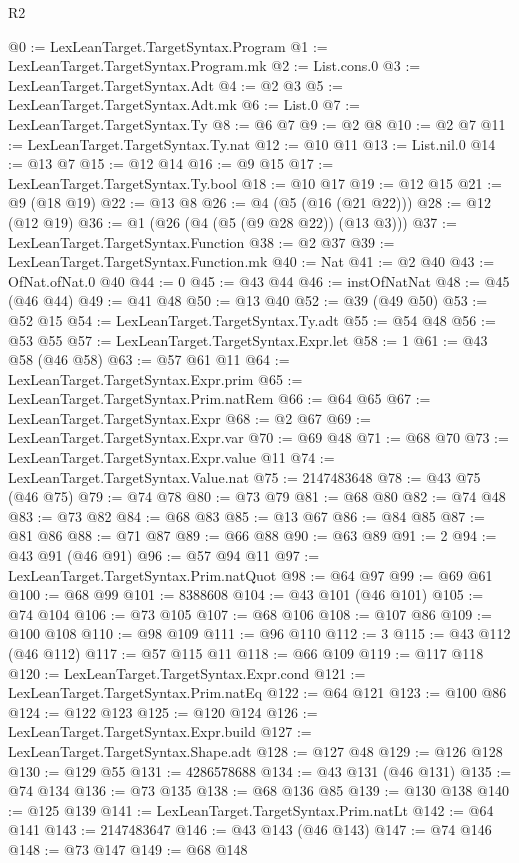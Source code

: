 \begin{lexlean}{R2}
\begin{coremodule}
@0 := LexLeanTarget.TargetSyntax.Program
@1 := LexLeanTarget.TargetSyntax.Program.mk
@2 := List.cons.{0}
@3 := LexLeanTarget.TargetSyntax.Adt
@4 := @2 @3
@5 := LexLeanTarget.TargetSyntax.Adt.mk
@6 := List.{0}
@7 := LexLeanTarget.TargetSyntax.Ty
@8 := @6 @7
@9 := @2 @8
@10 := @2 @7
@11 := LexLeanTarget.TargetSyntax.Ty.nat
@12 := @10 @11
@13 := List.nil.{0}
@14 := @13 @7
@15 := @12 @14
@16 := @9 @15
@17 := LexLeanTarget.TargetSyntax.Ty.bool
@18 := @10 @17
@19 := @12 @15
@21 := @9 (@18 @19)
@22 := @13 @8
@26 := @4 (@5 (@16 (@21 @22)))
@28 := @12 (@12 @19)
@36 := @1 (@26 (@4 (@5 (@9 @28 @22)) (@13 @3)))
@37 := LexLeanTarget.TargetSyntax.Function
@38 := @2 @37
@39 := LexLeanTarget.TargetSyntax.Function.mk
@40 := Nat
@41 := @2 @40
@43 := OfNat.ofNat.{0} @40
@44 := 0
@45 := @43 @44
@46 := instOfNatNat
@48 := @45 (@46 @44)
@49 := @41 @48
@50 := @13 @40
@52 := @39 (@49 @50)
@53 := @52 @15
@54 := LexLeanTarget.TargetSyntax.Ty.adt
@55 := @54 @48
@56 := @53 @55
@57 := LexLeanTarget.TargetSyntax.Expr.let
@58 := 1
@61 := @43 @58 (@46 @58)
@63 := @57 @61 @11
@64 := LexLeanTarget.TargetSyntax.Expr.prim
@65 := LexLeanTarget.TargetSyntax.Prim.natRem
@66 := @64 @65
@67 := LexLeanTarget.TargetSyntax.Expr
@68 := @2 @67
@69 := LexLeanTarget.TargetSyntax.Expr.var
@70 := @69 @48
@71 := @68 @70
@73 := LexLeanTarget.TargetSyntax.Expr.value @11
@74 := LexLeanTarget.TargetSyntax.Value.nat
@75 := 2147483648
@78 := @43 @75 (@46 @75)
@79 := @74 @78
@80 := @73 @79
@81 := @68 @80
@82 := @74 @48
@83 := @73 @82
@84 := @68 @83
@85 := @13 @67
@86 := @84 @85
@87 := @81 @86
@88 := @71 @87
@89 := @66 @88
@90 := @63 @89
@91 := 2
@94 := @43 @91 (@46 @91)
@96 := @57 @94 @11
@97 := LexLeanTarget.TargetSyntax.Prim.natQuot
@98 := @64 @97
@99 := @69 @61
@100 := @68 @99
@101 := 8388608
@104 := @43 @101 (@46 @101)
@105 := @74 @104
@106 := @73 @105
@107 := @68 @106
@108 := @107 @86
@109 := @100 @108
@110 := @98 @109
@111 := @96 @110
@112 := 3
@115 := @43 @112 (@46 @112)
@117 := @57 @115 @11
@118 := @66 @109
@119 := @117 @118
@120 := LexLeanTarget.TargetSyntax.Expr.cond
@121 := LexLeanTarget.TargetSyntax.Prim.natEq
@122 := @64 @121
@123 := @100 @86
@124 := @122 @123
@125 := @120 @124
@126 := LexLeanTarget.TargetSyntax.Expr.build
@127 := LexLeanTarget.TargetSyntax.Shape.adt
@128 := @127 @48
@129 := @126 @128
@130 := @129 @55
@131 := 4286578688
@134 := @43 @131 (@46 @131)
@135 := @74 @134
@136 := @73 @135
@138 := @68 @136 @85
@139 := @130 @138
@140 := @125 @139
@141 := LexLeanTarget.TargetSyntax.Prim.natLt
@142 := @64 @141
@143 := 2147483647
@146 := @43 @143 (@46 @143)
@147 := @74 @146
@148 := @73 @147
@149 := @68 @148

\end{coremodule}
\end{lexlean}
